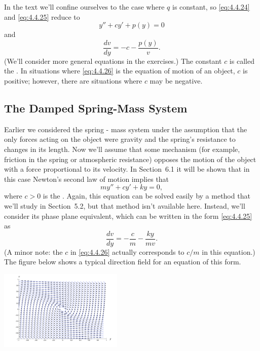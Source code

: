 \documentclass{ximera}
\begin{document}
In the text we'll confine ourselves to the case where $q$
is constant, so \eqref{eq:4.4.24} and \eqref{eq:4.4.25}  reduce to
\begin{equation} \label{eq:4.4.26}
y''+cy'+p(y)=0
\end{equation}
and
$$
\frac{dv}{dy}=-c-\frac{p(y)}{v}.
$$
(We'll consider more general equations in the exercises.) The constant
$c$ is called the . In situations where
\eqref{eq:4.4.26} is the equation of motion of an object, $c$ is positive;
however, there are situations where  $c$ may be negative.

\subsection*{The Damped Spring-Mass System}

Earlier we considered
the spring - mass system under the assumption that the only forces
acting on the object were gravity and the spring's resistance to
changes in its length. Now we'll assume that some mechanism (for
example, friction in the spring or atmospheric resistance) opposes the
motion of the object with a force proportional to its velocity. In
Section~6.1 it will be shown that in this case Newton's
second law of motion implies that
\begin{equation} \label{eq:4.4.27}
my''+cy'+ky=0,
\end{equation}
where $c>0$ is the . Again, this
equation can
be solved easily by a method that we'll study in Section~5.2,
but that method isn't available here. Instead, we'll consider its
phase plane equivalent, which can be written in the form \eqref{eq:4.4.25}
as
\begin{equation} \label{eq:4.4.28}
\frac{dv}{dy}=-\frac{c}{m}-\frac{ky}{mv}.
\end{equation}
(A minor note: the $c$ in \eqref{eq:4.4.26} actually corresponds to
$c/m$ in this equation.) The figure below shows a
typical direction field for an equation of this form.

\begin{image}
 \includegraphics[height=1.5in]{fig040411.jpg} 
\end{image}
\end{document}
